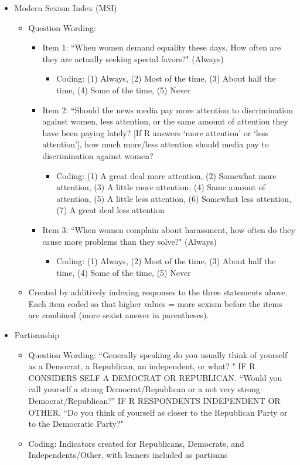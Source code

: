 \begin{itemize}
	\item Modern Sexism Index (MSI)
		\begin{itemize}
			\item Question Wording:
			\begin{itemize}
				\item Item 1: ``When women demand equality these days, How often are they are actually seeking special favors?" (Always)
				\begin{itemize}
					\item Coding: (1) Always, (2) Most of the time, (3) About half the time, (4) Some of the time, (5) Never
				\end{itemize}
				\item Item 2: ``Should the news media pay more attention to discrimination against women, less attention, or the same amount of attention they have been paying lately? [If R answers `more attention' or `less attention'], how much more/less attention should media pay to discrimination against women?
				\begin{itemize}
					\item Coding: (1) A great deal more attention, (2) Somewhat more attention, (3) A little more attention, (4) Same amount of attention, (5) A little less attention, (6) Somewhat less attention, (7) A great deal less attention
				\end{itemize}
				\item Item 3: ``When women complain about harassment, how often do they cause more problems than they solve?" (Always)
				\begin{itemize}
					\item Coding: (1) Always, (2) Most of the time, (3) About half the time, (4) Some of the time, (5) Never
				\end{itemize}
			\end{itemize}
			\item Created by additively indexing responses to the three statements above. Each item coded so that higher values = more sexism before the items are combined (more sexist answer in parentheses). 
		\end{itemize}
		
	\item Partisanship  
		\begin{itemize}
			\item Question Wording: ``Generally speaking do you usually think of yourself as a Democrat, a Republican, an independent, or what? " IF R CONSIDERS SELF A DEMOCRAT OR REPUBLICAN. ``Would you call yourself a strong Democrat/Republican or a not very strong Democrat/Republican?" IF R RESPONDENTS INDEPENDENT OR OTHER. ``Do you think of yourself as closer to the Republican Party or to the Democratic Party?"
			\item Coding: Indicators created for Republicans, Democrats, and Independents/Other, with leaners included as partisans
		\end{itemize}
		

\end{itemize}

